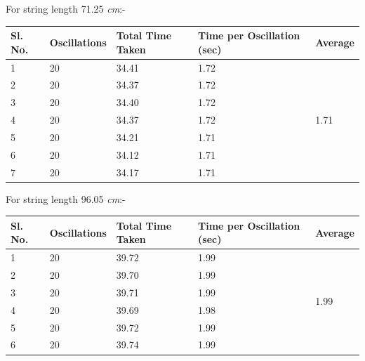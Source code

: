 \documentclass[12pt]{article}
\begin{document}
	For string length 71.25 \emph{cm}:-

	\begin{table}[H]
		\begin{tabular}{|l|l|l|l|l|}
			\hline
			Sl. No. & Oscillations & Total Time Taken & Time per Oscillation (sec) & Average               \\ \hline
			1       & 20           & 34.41            & 1.72                       & \multirow{7}{*}{1.71} \\ \cline{1-4}
			2       & 20           & 34.37            & 1.72                       &                       \\ \cline{1-4}
			3       & 20           & 34.40            & 1.72                       &                       \\ \cline{1-4}
			4       & 20           & 34.37            & 1.72                       &                       \\ \cline{1-4}
			5       & 20           & 34.21            & 1.71                       &                       \\ \cline{1-4}
			6       & 20           & 34.12            & 1.71                       &                       \\ \cline{1-4}
			7       & 20           & 34.17            & 1.71                       &                       \\ \hline
		\end{tabular}
	\end{table}

	\pagebreak

	For string length 96.05 \emph{cm}:-

	\begin{table}[H]
		\begin{tabular}{|l|l|l|l|l|}
			\hline
			Sl. No. & Oscillations & Total Time Taken & Time per Oscillation (sec) & Average               \\ \hline
			1       & 20           & 39.72            & 1.99                       & \multirow{6}{*}{1.99} \\ \cline{1-4}
			2       & 20           & 39.70            & 1.99                       &                       \\ \cline{1-4}
			3       & 20           & 39.71            & 1.99                       &                       \\ \cline{1-4}
			4       & 20           & 39.69            & 1.98                       &                       \\ \cline{1-4}
			5       & 20           & 39.72            & 1.99                       &                       \\ \cline{1-4}
			6       & 20           & 39.74            & 1.99                       &                       \\ \hline
		\end{tabular}
	\end{table}
\end{document}
